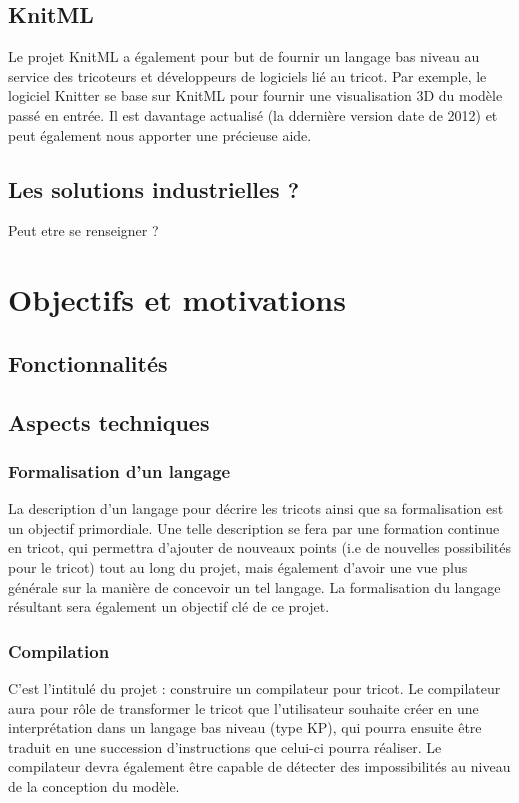\documentclass{article}
\begin{document}
\subsection{KnitML}

Le projet KnitML a également pour but de fournir un langage bas niveau au service des tricoteurs et développeurs de logiciels lié au 
tricot. Par exemple, le logiciel Knitter se base sur KnitML pour fournir une visualisation 3D du modèle passé en entrée. Il est davantage
actualisé (la ddernière version date de 2012) et peut également nous apporter une précieuse aide.

\subsection{Les solutions industrielles ?} Peut etre se renseigner ?

\section{Objectifs et motivations}

\subsection{Fonctionnalités}

\subsection{Aspects techniques}


\subsubsection{Formalisation d'un langage}

La description d'un langage pour décrire les tricots ainsi que sa formalisation est un objectif primordiale.
Une telle description se fera par une formation continue en tricot, qui permettra d'ajouter de nouveaux points (i.e de nouvelles
possibilités pour le tricot) tout au long du projet, mais également d'avoir une vue plus générale sur la manière de concevoir un tel
langage. La formalisation du langage résultant sera également un objectif clé de ce projet.

\subsubsection{Compilation}

C'est l'intitulé du projet : construire un compilateur pour tricot. Le compilateur aura pour rôle de transformer le tricot que
l'utilisateur souhaite créer en une interprétation dans un langage bas niveau (type KP), qui pourra ensuite être traduit en une succession 
d'instructions que celui-ci pourra réaliser. 
Le compilateur devra également être capable de détecter des impossibilités au niveau de la conception du modèle.
\end{document}
